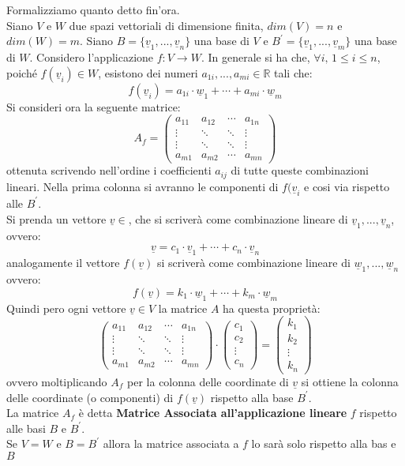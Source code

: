 \documentclass[a4paper,12pt, oneside]{book}
\begin{document}
\begin{definizione}
Formalizziamo quanto detto fin'ora.\\
Siano $V$ e $W$ due spazi vettoriali di dimensione finita, $dim (V)=n$ e $dim(W)=m$. Siano $B=\{\underline{v}_1,...,\underline{v}_n\}$ una base di $V$ e $B^{'}=\{\underline{v}_1,...,\underline{v}_m\}$ una base di $W$. Considero l'applicazione $f:V\to W$. In generale si ha che, $\forall i,\, 1\leq i\leq n$, poiché $f(\underline{v}_i)\in W$, esistono dei numeri $a_{1i},...,a_{mi}\in \mathbb{R}$ tali che:
$$f(\underline{v}_i)=a_{1i}\cdot \underline{w}_1+\cdots+a_{mi}\cdot \underline{w}_m$$
Si consideri ora la seguente matrice:
$$
A_f=\left(\begin{matrix}
a_{11} & a_{12} & \cdots & a_{1n}\\
\vdots & \ddots & \ddots & \vdots\\
\vdots & \ddots & \ddots & \vdots\\
a_{m1} & a_{m2} & \cdots & a_{mn}
\end{matrix}\right)
$$
ottenuta scrivendo nell'ordine i coefficienti $a_{ij}$ di tutte queste combinazioni lineari. Nella prima colonna si avranno le componenti di $f(\underline{v}_i$ e cosi via rispetto alle $B^{'}$.\\
Si prenda un vettore $\underline{v}\in $, che si scriverà come combinazione lineare di $\underline{v}_1,...,\underline{v}_n $, ovvero:
$$\underline{v}=c_1\cdot \underline{v}_1+\cdots +c_n\cdot\underline{v}_n$$
analogamente il vettore $f(\underline{v})$ si scriverà come combinazione lineare di $\underline{w}_1,...,\underline{w}_n $ ovvero:
$$f(\underline{v})=k_1\cdot \underline{w}_1+\cdots+k_m\cdot \underline{w}_m$$
Quindi pero ogni vettore $\underline{v}\in V$ la matrice $A$ ha questa proprietà:
$$
\left(\begin{matrix}
a_{11} & a_{12} & \cdots & a_{1n}\\
\vdots & \ddots & \ddots & \vdots\\
\vdots & \ddots & \ddots & \vdots\\
a_{m1} & a_{m2} & \cdots & a_{mn}
\end{matrix}\right)\cdot\left(\begin{matrix}
c_1\\
c_2\\
\vdots\\
c_n
\end{matrix}\right)=\left(\begin{matrix}
k_1\\
k_2\\
\vdots\\
k_n
\end{matrix}\right)
$$
ovvero moltiplicando $A_f$ per la colonna delle coordinate di $\underline{v}$ si ottiene la colonna delle coordinate (o componenti) di $f(\underline{v})$ rispetto alla base $B^{'}$. \\
La matrice $A_f$ è detta \textbf{Matrice Associata all'applicazione lineare} $f$ rispetto alle basi $B$ e $B^{'}$.\\
Se $V=W $ e $B=B^{'}$ allora la matrice associata a $f$ lo sarà solo rispetto alla bas e $B$
\end{definizione}
\newpage
\end{document}
